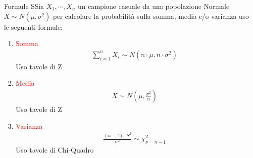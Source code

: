 \documentclass{article}  %
\theoremstyle{definition}
\begin{document}
\begin{theorem}{Formule}
	SSia $X_1, \cdots, X_n$ un campione casuale da una popolazione Normale $X \sim N(\mu, \sigma^2)$ per calcolare la probabilità sulla somma, media e/o varianza uso le seguenti formule:
	\begin{enumerate}
		\item \textcolor{red}{Somma}
		      \begin{align*}
			      \sum_{i=1}^{n} X_i \sim N(n \cdot \mu, n \cdot \sigma^2)
		      \end{align*}
		      Uso tavole di Z
		\item \textcolor{red}{Media}
		      \begin{align*}
			      \overline{X} \sim N\left(\mu, \frac{\sigma^2}{n}\right)
		      \end{align*}
		      Uso tavole di Z
		\item \textcolor{red}{Varianza}
		      \begin{align*}
			      \frac{(n-1)\cdot S^2}{\sigma^2} \sim \chi^2_{\nu=n-1}
		      \end{align*}
		      Uso tavole di Chi-Quadro
	\end{enumerate}

\end{theorem}
\end{document}
